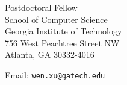 \begin{minipage}[t]{0.45\textwidth}
  Postdoctoral Fellow\\
  School of Computer Science\\
  Georgia Institute of Technology\\
  756 West Peachtree Street NW\\
  Atlanta, GA 30332-4016
\end{minipage}
\begin{minipage}[t]{0.45\textwidth}
  Email: \texttt{wen.xu@gatech.edu} \\
\end{minipage}
